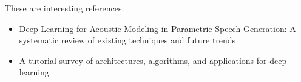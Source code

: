 These are interesting references:

\begin{itemize} %
	\item Deep Learning for Acoustic Modeling in Parametric Speech Generation: A systematic review of existing techniques and future trends \cite{ling:deep}
	\item A tutorial survey of architectures, algorithms, and applications for deep learning \cite{li:survey}
\end{itemize}

\clearpage